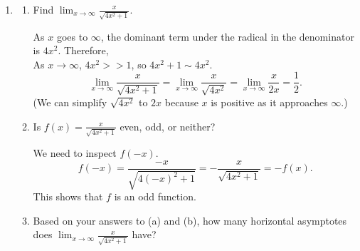 \documentclass{article}
\begin{document}
\begin{enumerate}
\begin{enumerate}
    \begin{solution}
      Since $f(x) = \dfrac{2x-6}{x^2-3x}=\frac{2}{x}, x\neq 3$, the graph of $y=f(x)$ is the same as the graph
      of $y=\frac{2}{x}$ but with a hole at $x=3$.

    \end{solution}

  \end{enumerate}

\item 
  \begin{enumerate}
  \item
    \begin{problem}[\vfill]
      Find $\displaystyle \lim_{x \to \infty} \frac{x}{\sqrt{4x^2 + 1}}$.
    \end{problem}

    \begin{solution}
      As $x$ goes to $\infty$, the dominant term under the radical in the denominator is $4x^2$. Therefore,\\
      As $x\to\infty$, $4x^2>>1$, so $4x^2+1\sim4x^2$.
      \[
        \lim_{x \to \infty} \frac{x}{\sqrt{4x^2+1}} = \lim_{x \to \infty} \frac{x}{\sqrt{4x^2}} 
        = \lim_{x \to \infty} \frac{x}{2x} 
        = \frac{1}{2}.
      \]
      (We can simplify $\sqrt{4x^2}$ to $2x$ because $x$ is positive as it approaches $\infty$.)
    \end{solution}

  \item
    \begin{problem}[\vfill]
      Is $\displaystyle f(x) = \frac{x}{\sqrt{4x^2 + 1}}$ even, odd, or neither? 
    \end{problem}

    \begin{solution}
      We need to inspect $f(-x)$. 
      \[f(-x) = \frac{-x}{\sqrt{4(-x)^2+1}} = -\frac{x}{\sqrt{4x^2+1}} = -f(x).\]
      This shows that $f$ is an odd function.
    \end{solution}

  \item
    \begin{problem}[\vfill]
      Based on your answers to (a) and (b), how many horizontal asymptotes does $\displaystyle \lim_{x \to \infty} \frac{x}{\sqrt{4x^2 + 1}}$ have? 
    \end{problem}


\end{enumerate}
\end{enumerate}
\end{document}
